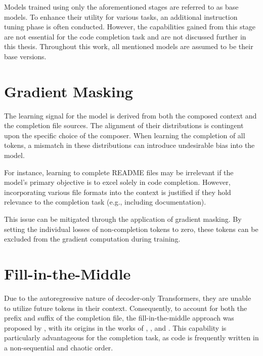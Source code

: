 Models trained using only the aforementioned stages are referred to as base models. To enhance their utility for various tasks, an additional instruction tuning phase is often conducted. However, the capabilities gained from this stage are not essential for the code completion task and are not discussed further in this thesis. Throughout this work, all mentioned models are assumed to be their base versions.

\section{Gradient Masking}

The learning signal for the model is derived from both the composed context and the completion file sources. The alignment of their distributions is contingent upon the specific choice of the composer. When learning the completion of all tokens, a mismatch in these distributions can introduce undesirable bias into the model.

For instance, learning to complete README files may be irrelevant if the model's primary objective is to excel solely in code completion. However, incorporating various file formats into the context is justified if they hold relevance to the completion task (e.g., including documentation).

This issue can be mitigated through the application of gradient masking. By setting the individual losses of non-completion tokens to zero, these tokens can be excluded from the gradient computation during training.


\section{Fill-in-the-Middle}\label{sec:fill-in-the-middle}


Due to the autoregressive nature of decoder-only Transformers, they are unable to utilize future tokens in their context. Consequently, to account for both the prefix and suffix of the completion file, the fill-in-the-middle approach was proposed by \citet{bavarian2022}, with its origins in the works of \citet{donahue2020}, \citet{aghajanyan2022}, and \citet{fried2022}. This capability is particularly advantageous for the completion task, as code is frequently written in a non-sequential and chaotic order.

